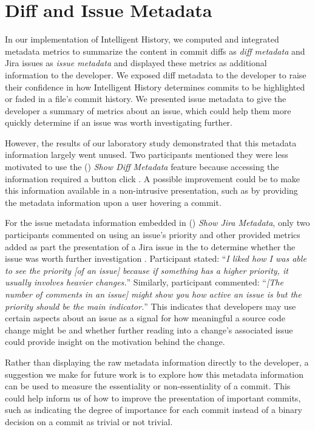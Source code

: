 
\section{Diff and Issue Metadata}

In our implementation of Intelligent History,
we computed and integrated metadata metrics to summarize 
the content in commit diffs as \emph{diff metadata} and Jira issues as \emph{issue metadata} 
and displayed these metrics as additional information to the developer.
We exposed diff metadata to the developer to raise their confidence in how Intelligent History
determines commits to be highlighted or faded in a file's commit history.
We presented issue metadata to give the developer a summary of metrics about
an issue, which could help them more quickly determine if an issue was worth investigating further.

However, the results of our laboratory study demonstrated that this metadata information largely went unused.
Two participants mentioned they were less motivated to use the () \textit{Show Diff Metadata} feature
because accessing the information required a button click .
A possible improvement could be to make this information available in a non-intrusive presentation,
such as by providing the metadata information upon a user hovering a commit.

For the issue metadata information embedded in () \textit{Show Jira Metadata},
only two participants commented on using an issue's priority and other provided metrics added as part the presentation
of a Jira issue in the  to determine whether the issue was worth further investigation .
Participant  stated: 
``\textit{I liked how I was able to see the priority [of an issue] because if something has a higher priority, it usually involves heavier changes.}''
Similarly, participant  commented:
``\textit{[The number of comments in an issue] might show you how active an issue is but the priority should be the main indicator.}''
This indicates that developers may use certain aspects about an issue as a signal 
for how meaningful a source code change might be and whether further reading into a change's associated issue
could provide insight on the motivation behind the change.

Rather than displaying the raw metadata information directly to the developer,
a suggestion we make for future work is to explore how this metadata information
can be used to measure the essentiality or non-essentiality of a commit.
This could help inform us of how to improve the presentation of important
commits, such as indicating the degree of importance for each commit 
instead of a binary decision on a commit as trivial or not trivial.

\endinput

Any text after an \endinput is ignored.
You could put scraps here or things in progress.